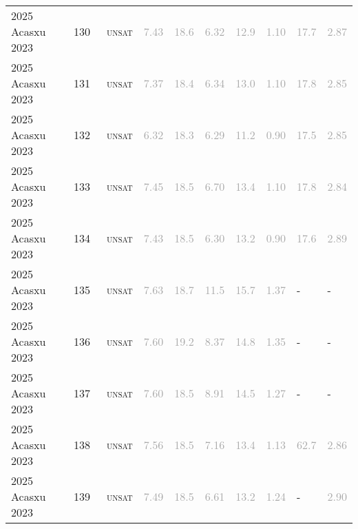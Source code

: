 \begin{center}
{\begin{longtable}{@{}llllllllll@{}}
2025 Acasxu 2023 & 130 & ~\textsc{unsat} & \textcolor{darkgray}{7.43} & \textcolor{darkgray}{18.6} & \textcolor{darkgray}{6.32} & \textcolor{darkgray}{12.9} & \textcolor{darkgray}{1.10} & \textcolor{darkgray}{17.7} & \textcolor{darkgray}{2.87} \\
2025 Acasxu 2023 & 131 & ~\textsc{unsat} & \textcolor{darkgray}{7.37} & \textcolor{darkgray}{18.4} & \textcolor{darkgray}{6.34} & \textcolor{darkgray}{13.0} & \textcolor{darkgray}{1.10} & \textcolor{darkgray}{17.8} & \textcolor{darkgray}{2.85} \\
2025 Acasxu 2023 & 132 & ~\textsc{unsat} & \textcolor{darkgray}{6.32} & \textcolor{darkgray}{18.3} & \textcolor{darkgray}{6.29} & \textcolor{darkgray}{11.2} & \textcolor{darkgray}{0.90} & \textcolor{darkgray}{17.5} & \textcolor{darkgray}{2.85} \\
2025 Acasxu 2023 & 133 & ~\textsc{unsat} & \textcolor{darkgray}{7.45} & \textcolor{darkgray}{18.5} & \textcolor{darkgray}{6.70} & \textcolor{darkgray}{13.4} & \textcolor{darkgray}{1.10} & \textcolor{darkgray}{17.8} & \textcolor{darkgray}{2.84} \\
2025 Acasxu 2023 & 134 & ~\textsc{unsat} & \textcolor{darkgray}{7.43} & \textcolor{darkgray}{18.5} & \textcolor{darkgray}{6.30} & \textcolor{darkgray}{13.2} & \textcolor{darkgray}{0.90} & \textcolor{darkgray}{17.6} & \textcolor{darkgray}{2.89} \\
2025 Acasxu 2023 & 135 & ~\textsc{unsat} & \textcolor{darkgray}{7.63} & \textcolor{darkgray}{18.7} & \textcolor{darkgray}{11.5} & \textcolor{darkgray}{15.7} & \textcolor{darkgray}{1.37} & - & - \\
2025 Acasxu 2023 & 136 & ~\textsc{unsat} & \textcolor{darkgray}{7.60} & \textcolor{darkgray}{19.2} & \textcolor{darkgray}{8.37} & \textcolor{darkgray}{14.8} & \textcolor{darkgray}{1.35} & - & - \\
2025 Acasxu 2023 & 137 & ~\textsc{unsat} & \textcolor{darkgray}{7.60} & \textcolor{darkgray}{18.5} & \textcolor{darkgray}{8.91} & \textcolor{darkgray}{14.5} & \textcolor{darkgray}{1.27} & - & - \\
2025 Acasxu 2023 & 138 & ~\textsc{unsat} & \textcolor{darkgray}{7.56} & \textcolor{darkgray}{18.5} & \textcolor{darkgray}{7.16} & \textcolor{darkgray}{13.4} & \textcolor{darkgray}{1.13} & \textcolor{darkgray}{62.7} & \textcolor{darkgray}{2.86} \\
2025 Acasxu 2023 & 139 & ~\textsc{unsat} & \textcolor{darkgray}{7.49} & \textcolor{darkgray}{18.5} & \textcolor{darkgray}{6.61} & \textcolor{darkgray}{13.2} & \textcolor{darkgray}{1.24} & - & \textcolor{darkgray}{2.90} \\

\end{longtable}}
\end{center}
